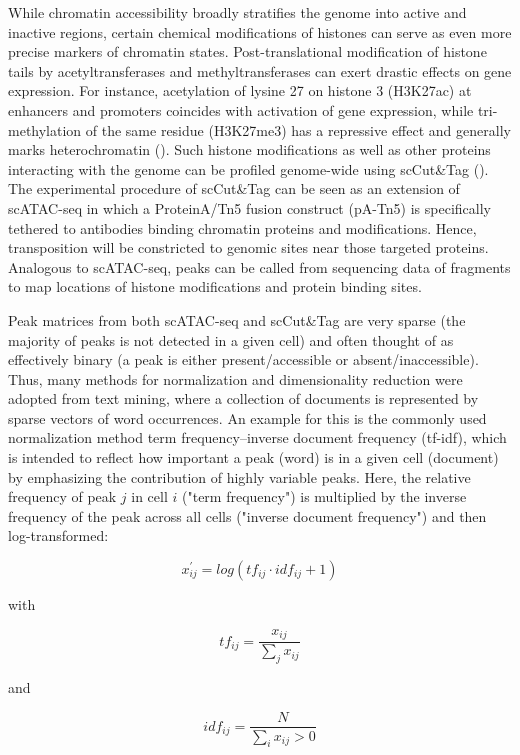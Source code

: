 While chromatin accessibility broadly stratifies the genome into active and inactive regions, certain chemical modifications of histones can serve as even more precise markers of chromatin states. Post-translational modification of histone tails by acetyltransferases and methyltransferases can exert drastic effects on gene expression. For instance, acetylation of lysine 27 on histone 3 (H3K27ac) at enhancers and promoters coincides with activation of gene expression, while tri-methylation of the same residue (H3K27me3) has a repressive effect and generally marks heterochromatin (\cite{allis_molecular_2016}). Such histone modifications as well as other proteins interacting with the genome can be profiled genome-wide using scCut\&Tag (\cite{bartosovic_single-cell_2021,kaya-okur_cuttag_2019}). The experimental procedure of scCut\&Tag can be seen as an extension of scATAC-seq in which a ProteinA/Tn5 fusion construct (pA-Tn5) is specifically tethered to antibodies binding chromatin proteins and modifications. Hence, transposition will be constricted to genomic sites near those targeted proteins. Analogous to scATAC-seq, peaks can be called from sequencing data of fragments to map locations of histone modifications and protein binding sites.

Peak matrices from both scATAC-seq and scCut\&Tag are very sparse (the majority of peaks is not detected in a given cell) and often thought of as effectively binary (a peak is either present/accessible or absent/inaccessible). Thus, many methods for normalization and dimensionality reduction were adopted from text mining, where a collection of documents is represented by sparse vectors of word occurrences. An example for this is the commonly used normalization method term frequency–inverse document frequency (tf-idf), which is intended to reflect how important a peak (word) is in a given cell (document) by emphasizing the contribution of highly variable peaks. Here, the relative frequency of peak $j$ in cell $i$ ("term frequency") is multiplied by the inverse frequency of the peak across all cells ("inverse document frequency") and then log-transformed:

\[ x^{\prime}_{ij} = log(tf_{ij} \cdot idf_{ij} + 1) \]

with

\[ tf_{ij} = \frac{x_{ij}} {\sum_{j}{x_{ij}}} \]

and 

\[ idf_{ij} = \frac{N}{\sum_{i}{x_{ij} > 0}} \]

